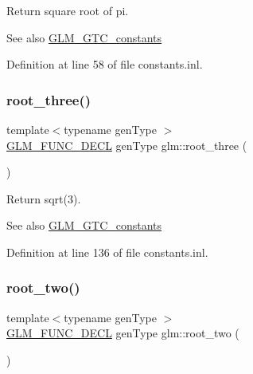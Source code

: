Return square root of pi. \begin{DoxySeeAlso}{See also}
\hyperlink{group__gtc__constants}{G\+L\+M\+\_\+\+G\+T\+C\+\_\+constants} 
\end{DoxySeeAlso}


Definition at line 58 of file constants.\+inl.

\mbox{\label{group__gtc__constants_gab3183635ac615473e2f95852f491be83}} 
\subsubsection{\texorpdfstring{root\+\_\+three()}{root\_three()}}
{\footnotesize\ttfamily template$<$typename gen\+Type $>$ \\
\hyperlink{setup_8hpp_ab2d052de21a70539923e9bcbf6e83a51}{G\+L\+M\+\_\+\+F\+U\+N\+C\+\_\+\+D\+E\+CL} gen\+Type glm\+::root\+\_\+three (\begin{DoxyParamCaption}{ }\end{DoxyParamCaption})}

Return sqrt(3). \begin{DoxySeeAlso}{See also}
\hyperlink{group__gtc__constants}{G\+L\+M\+\_\+\+G\+T\+C\+\_\+constants} 
\end{DoxySeeAlso}


Definition at line 136 of file constants.\+inl.

\mbox{\label{group__gtc__constants_gab91b7799f88f9f2be33e385dec11b9c2}} 
\subsubsection{\texorpdfstring{root\+\_\+two()}{root\_two()}}
{\footnotesize\ttfamily template$<$typename gen\+Type $>$ \\
\hyperlink{setup_8hpp_ab2d052de21a70539923e9bcbf6e83a51}{G\+L\+M\+\_\+\+F\+U\+N\+C\+\_\+\+D\+E\+CL} gen\+Type glm\+::root\+\_\+two (\begin{DoxyParamCaption}{ }\end{DoxyParamCaption})}

